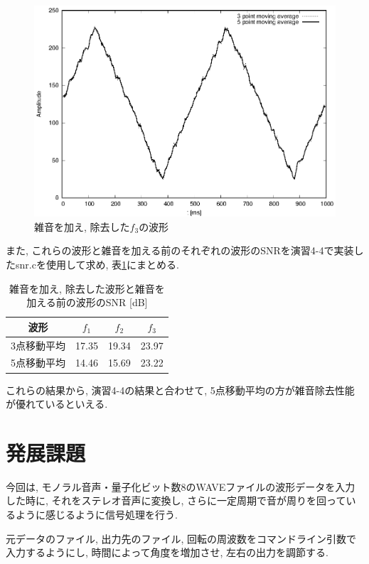 \documentclass[titlepage]{jsarticle}
\begin{document}
    \begin{figure}[h]
        \centering
        \includegraphics[width=0.8\hsize]{images/f3mv.eps}
        \caption{雑音を加え, 除去した$f_3$の波形}
        \label{fig:f3mv}
    \end{figure}

    また, これらの波形と雑音を加える前のそれぞれの波形のSNRを演習4-4で実装したsnr.cを使用して求め,
    表\ref{tab:fsnr}にまとめる.

    \begin{table}[h]
        \centering
        \caption{雑音を加え, 除去した波形と雑音を加える前の波形のSNR [dB]}
        \label{tab:fsnr}
        \begin{tabular}{c|ccc} \hline
            波形 & $f_1$ & $f_2$ & $f_3$ \\ \hline \hline
            3点移動平均 & 17.35 & 19.34 & 23.97 \\
            5点移動平均 & 14.46 & 15.69 & 23.22 \\ \hline
        \end{tabular}
    \end{table}

    これらの結果から, 演習4-4の結果と合わせて, 5点移動平均の方が雑音除去性能が優れているといえる.

\section{発展課題}
    今回は, モノラル音声・量子化ビット数8のWAVEファイルの波形データを入力した時に,
    それをステレオ音声に変換し, さらに一定周期で音が周りを回っているように感じるように信号処理を行う.

    元データのファイル, 出力先のファイル, 回転の周波数をコマンドライン引数で入力するようにし,
    時間によって角度を増加させ, 左右の出力を調節する.
\end{document}
